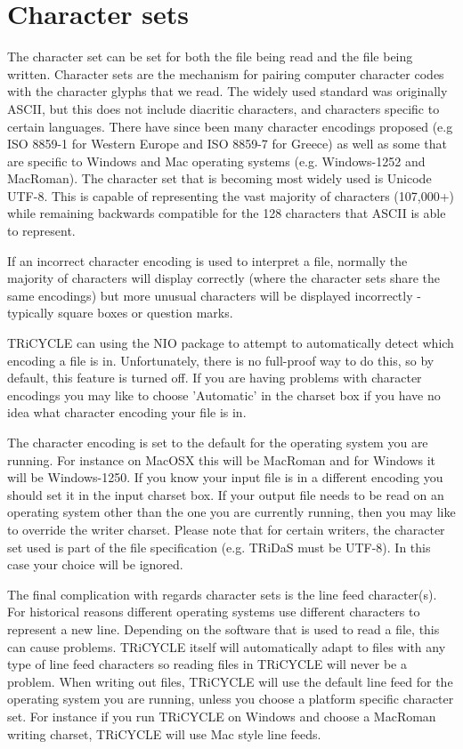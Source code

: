 \documentclass[10pt, headsepline,DIV14,BCOR0.5cm]{scrreprt}
\begin{document}
\section{Character sets}

The character set can be set for both the file being read and the file being written. Character sets are the
mechanism for pairing computer character codes with the character glyphs that we read. The widely
used standard was originally ASCII, but this does not include diacritic characters, and characters specific
to certain languages. There have since been many character encodings proposed (e.g ISO 8859-1 for
Western Europe and ISO 8859-7 for Greece) as well as some that are specific to Windows and Mac
operating systems (e.g. Windows-1252 and MacRoman). The character set that is becoming most widely
used is Unicode UTF-8. This is capable of representing the vast majority of characters (107,000+) while remaining
backwards compatible for the 128 characters that ASCII is able to represent.

If an incorrect character encoding is used to interpret a file, normally the majority of characters will display
correctly (where the character sets share the same encodings) but more unusual characters will be displayed
incorrectly - typically square boxes or question marks.

TRiCYCLE can using the NIO package to attempt to automatically detect which encoding a file is in.
Unfortunately, there is no full-proof way to do this, so by default, this feature is turned off. If you are
having problems with character encodings you may like to choose 'Automatic' in the charset box if you
have no idea what character encoding your file is in.

The character encoding is set to the default for the operating system you are running. For instance on
MacOSX this will be MacRoman and for Windows it will be Windows-1250. If you know your input file
is in a different encoding you should set it in the input charset box. If your output file needs to be read
on an operating system other than the one you are currently running, then you may like to override the
writer charset. Please note that for certain writers, the character set used is part of the file specification
(e.g. TRiDaS must be UTF-8). In this case your choice will be ignored.

The final complication with regards character sets is the line feed character(s). For historical reasons
different operating systems use different characters to represent a new line. Depending on the software
that is used to read a file, this can cause problems. TRiCYCLE itself will automatically adapt to files with
any type of line feed characters so reading files in TRiCYCLE will never be a problem. When writing
out files, TRiCYCLE will use the default line feed for the operating system you are running, unless you
choose a platform specific character set. For instance if you run TRiCYCLE on Windows and choose a
MacRoman writing charset, TRiCYCLE will use Mac style line feeds.
\end{document}
